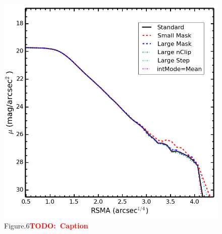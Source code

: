 \documentclass[preprint]{aastex}
\newcommand{\todo}[1]{\textcolor{red}{\textbf{TODO:~#1}}}
\begin{document}
\begin{CJK*}{UTF8}{gbsn}
\clearpage
{}
\begin{figure}
    \centering 
    \includegraphics[width=14.0cm]{fig/redbcg_1_HSC-I_full_imgsub_ellip_default_compare.png}
    \caption{Figure.6\todo{Caption}}\label{figure:6}
\end{figure}


\end{CJK*}

\clearpage 

%

\label{lastpage}
\end{document}
